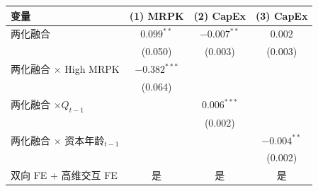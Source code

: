 {\scriptsize
\begin{center}
\begin{tabular}{lccc}
  \toprule
  变量 & (1) MRPK & (2) CapEx & (3) CapEx \\
  \midrule
  两化融合 & $0.099^{**}$ & $-0.007^{**}$ & 0.002 \\
           & (0.050) & (0.003) & (0.003) \\
  两化融合 $\times$ High MRPK & $-0.382^{***}$ &  &  \\
                              & (0.064) &  &  \\
  两化融合 $\times Q_{t-1}$ &  & $0.006^{***}$ &  \\
                              &  & (0.002) &  \\
  两化融合 $\times$ 资本年龄$_{t-1}$ &  &  & $-0.004^{**}$ \\
                                      &  &  & (0.002) \\
  双向 FE + 高维交互 FE & 是 & 是 & 是 \\
  \bottomrule
\end{tabular}
\end{center}
}
